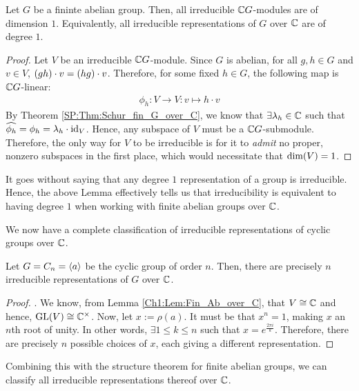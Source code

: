 \begin{lemma} \label{Ch1:Lem:Fin_Ab_over_C}
    Let $G$ be a fininte abelian group. Then, all irreducible $\mathbb{C} G$-modules are of dimension $1$. Equivalently, all irreducible representations of $G$ over $\mathbb{C}$ are of degree $1$.
\end{lemma}
\begin{proof}
    Let $V$ be an irreducible $\mathbb{C} G$-module. Since $G$ is abelian, for all $g,h \in G$ and $v \in V$, $\left( gh \right) \cdot v = \left( hg \right) \cdot v$. Therefore, for some fixed $h \in G$, the following map is $\mathbb{C} G$-linear:
    \begin{align*}
        \phi_h : V \to V : v \mapsto h \cdot v
    \end{align*}
    By Theorem \ref{SP:Thm:Schur_fin_G_over_C}, we know that $\exists \lambda_h \in \mathbb{C}$ such that $\widehat{\phi_h} = \phi_h = \lambda_h \cdot \operatorname{id}_V$. Hence, any subspace of $V$ must be a $\mathbb{C} G$-submodule. Therefore, the only way for $V$ to be irreducible is for it to \textit{admit} no proper, nonzero subspaces in the first place, which would necessitate that $\dim\!\left( V \right) = 1$.
\end{proof}
\begin{remark}
    It goes without saying that any degree $1$ representation of a group is irreducible. Hence, the above Lemma effectively tells us that irreducibility is equivalent to having degree $1$ when working with finite abelian groups over $\mathbb{C}$.
\end{remark}

We now have a complete classification of irreducible representations of cyclic groups over $\mathbb{C}$.

\begin{corollary}\label{Ch1:Cor:Irr_Cycl}
    Let $G = C_n = \left\langle a \right\rangle$ be the cyclic group of order $n$. Then, there are precisely $n$ irreducible representations of $G$ over $\mathbb{C}$.
    \begin{proof}
        . We know, from Lemma \ref{Ch1:Lem:Fin_Ab_over_C}, that $V \cong \mathbb{C}$ and hence, $\operatorname{GL}\!\left( V \right) \cong \mathbb{C}^\times$. Now, let $x := \rho(a)$. It must be that $x^n = 1$, making $x$ an $n$th root of unity. In other words, $\exists 1 \leq k \leq n$ such that $x = e^{\frac{2\pi i}{k}}$. Therefore, there are precisely $n$ possible choices of $x$, each giving a different representation.
    \end{proof}
\end{corollary}

Combining this with the structure theorem for finite abelian groups, we can classify all irreducible representations thereof over $\mathbb{C}$.

